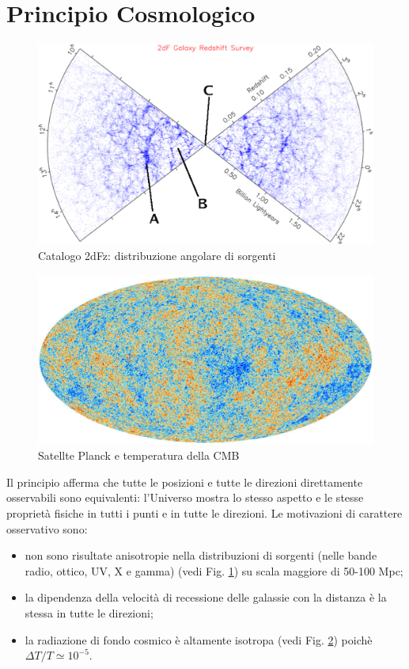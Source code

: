 \section{Principio Cosmologico}

\begin{figure}
  \centering{}
  \includegraphics[width=\textwidth]{figure/2dFzcone.pdf}
  \caption{Catalogo 2dFz: distribuzione angolare di sorgenti}
  \label{cat_2d}
\end{figure}
\begin{figure}
  \includegraphics[width=\textwidth]{figure/Planck_CMB.pdf}
  \caption{Satellte Planck e temperatura della CMB}
  \label{sat_Planck}
\end{figure}
Il principio afferma che tutte le posizioni e tutte le direzioni direttamente
osservabili sono equivalenti: l'Universo mostra lo stesso aspetto e le stesse
proprietà fisiche in tutti i punti e in tutte le direzioni.  Le motivazioni di
carattere osservativo sono:
\begin{itemize}
\item non sono risultate anisotropie nella distribuzioni di sorgenti (nelle
  bande radio, ottico, UV, X e gamma) (vedi Fig. \ref{cat_2d}) su scala maggiore
  di 50-100 Mpc;
\item la dipendenza della velocità di recessione delle galassie con la distanza
  è la stessa in tutte le direzioni;
\item la radiazione di fondo cosmico è altamente isotropa (vedi
  Fig. \ref{sat_Planck}) poichè $\Delta T / T \simeq 10^{-5}$.
\end{itemize}

